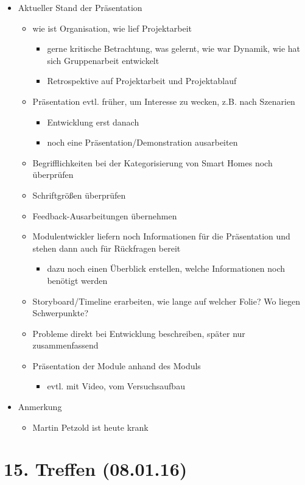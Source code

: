 \begin{itemize}
	\item Aktueller Stand der Präsentation
	\begin{itemize}
		\item wie ist Organisation, wie lief Projektarbeit
		\begin{itemize}
			\item gerne kritische Betrachtung, was gelernt, wie war Dynamik, wie hat sich Gruppenarbeit entwickelt
			\item Retrospektive auf Projektarbeit und Projektablauf
		\end{itemize}
		\item Präsentation evtl. früher, um Interesse zu wecken, z.B. nach Szenarien
		\begin{itemize}
			\item Entwicklung erst danach
			\item noch eine Präsentation/Demonstration ausarbeiten
		\end{itemize}
		\item Begrifflichkeiten bei der Kategorisierung von Smart Homes noch überprüfen
		\item Schriftgrößen überprüfen
		\item Feedback-Ausarbeitungen übernehmen
		\item Modulentwickler liefern noch Informationen für die Präsentation und stehen dann auch für Rückfragen bereit
		\begin{itemize}
			\item dazu noch einen Überblick erstellen, welche Informationen noch benötigt werden
		\end{itemize}
		\item Storyboard/Timeline erarbeiten, wie lange auf welcher Folie? Wo liegen Schwerpunkte?
		\item Probleme direkt bei Entwicklung beschreiben, später nur zusammenfassend
		\item Präsentation der Module anhand des Moduls
		\begin{itemize}
			\item 	evtl. mit Video, vom Versuchsaufbau
		\end{itemize}
	\end{itemize}

	\item Anmerkung
	\begin{itemize}
		\item Martin Petzold ist heute krank
	\end{itemize}
\end{itemize}

\section{15. Treffen (08.01.16)}